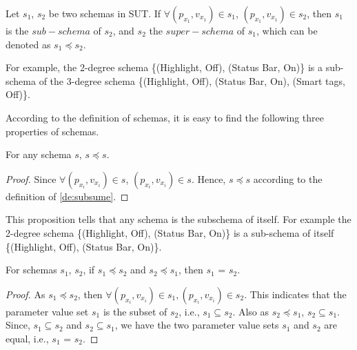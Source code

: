 \begin{definition}\label{de:subsume}
Let $s_{1}$, $s_{2}$ be two schemas in SUT. If $\forall (p_{x_{1}}, v_{x_{1}}) \in s_{1}$, $(p_{x_{1}}, v_{x_{1}}) \in s_{2}$, then $s_{1}$ is the $sub-schema$ of $s_{2}$, and $s_{2}$ the $super-schema$ of $s_{1}$, which can be denoted as $s_{1} \preceq s_{2}$.
\end{definition}

For example,  the 2-degree schema \{(Highlight, Off), (Status Bar, On)\} is a sub-schema of the 3-degree schema \{(Highlight, Off), (Status Bar, On), (Smart tags, Off)\}. 

According to the definition of schemas, it is easy to find the following three properties of schemas.

\begin{proposition}[Reflexivity]\label{pro:subsumereflexivity}
For any schema $s$, $s \preceq s$.
\end{proposition}

\begin{proof}
Since $\forall (p_{x_{i}}, v_{x_{i}})\in s$, $(p_{x_{i}}, v_{x_{i}}) \in s$. Hence, $s \preceq s$ according to the definition of \ref{de:subsume}.
\end{proof}

This proposition tells that any schema is the subschema of itself. For example the 2-degree schema \{(Highlight, Off), (Status Bar, On)\} is a sub-schema of itself  \{(Highlight, Off), (Status Bar, On)\}.

\begin{proposition}[Antisymmetry]\label{pro:subsumeantisymmetry}
For schemas $s_{1}$, $s_{2}$, if $s_{1} \preceq s_{2}$ and $s_{2} \preceq  s_{1}$, then $s_{1}$ = $s_{2}$.
\end{proposition}

\begin{proof}
As $s_{1} \preceq s_{2}$, then $\forall (p_{x_{i}}, v_{x_{i}})\in s_{1}, (p_{x_{i}}, v_{x_{i}}) \in s_{2}$. This indicates that the parameter value set $s_{1}$ is the subset of  $s_{2}$, i.e., $s_{1} \subseteq s_{2}$.  Also as $s_{2} \preceq s_{1}$, $s_{2} \subseteq s_{1}$. Since, $s_{1} \subseteq s_{2}$ and $s_{2} \subseteq s_{1}$, we have the two parameter value sets $s_{1}$ and $s_{2}$ are equal, i.e., $s_{1}$ = $s_{2}$.
\end{proof}


